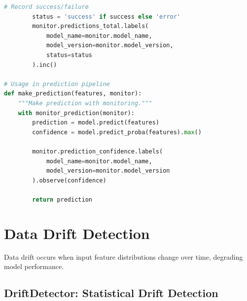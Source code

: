 \begin{lstlisting}[language=Python, caption={Custom Metrics Configuration}]
        # Record success/failure
        status = 'success' if success else 'error'
        monitor.predictions_total.labels(
            model_name=monitor.model_name,
            model_version=monitor.model_version,
            status=status
        ).inc()

# Usage in prediction pipeline
def make_prediction(features, monitor):
    """Make prediction with monitoring."""
    with monitor_prediction(monitor):
        prediction = model.predict(features)
        confidence = model.predict_proba(features).max()

        monitor.prediction_confidence.labels(
            model_name=monitor.model_name,
            model_version=monitor.model_version
        ).observe(confidence)

        return prediction
\end{lstlisting}

\section{Data Drift Detection}

Data drift occurs when input feature distributions change over time, degrading model performance.

\subsection{DriftDetector: Statistical Drift Detection}

